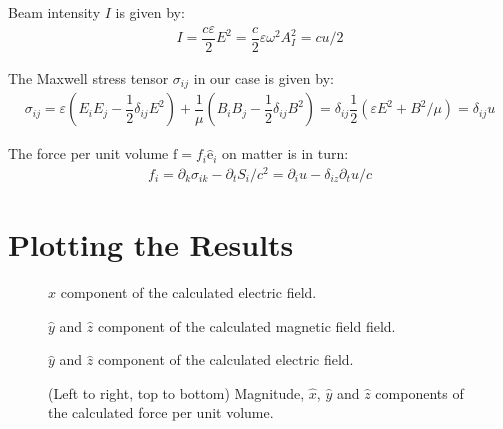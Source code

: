 \documentclass[10pt]{article}
\newcommand{\f}[2]{\dfrac{#1}{#2}} %
\newcommand{\p}[1]{\left(#1\right)} %
\renewcommand{\epsilon}{\varepsilon} %
\renewcommand{\v}[1]{\boldsymbol{\mathrm{#1}}} %
\newcommand{\uv}[1]{\hat{\boldsymbol{\mathrm{#1}}}} %
\renewcommand{\d}{\partial} %
\begin{document}
Beam intensity $I$ is given by:
\begin{align*}
  I=\f{c\epsilon}2E^2=\f c2\epsilon\omega^2A_I^2=cu/2
\end{align*}

The Maxwell stress tensor $\sigma_{ij}$ in our case is given by:
\begin{align*}
  \sigma_{ij}=\epsilon\p{E_iE_j-\f12\delta_{ij}E^2}
  +\f1\mu\p{B_iB_j-\f12\delta_{ij}B^2} =\delta_{ij}\f12\p{\epsilon
    E^2+B^2/\mu}=\delta_{ij}u
\end{align*}

The force per unit volume $\v f=f_i\uv e_i$ on matter is in turn:
\begin{align*}
  f_i=\d_k\sigma_{ik}-\d_tS_i/c^2=\d_iu-\delta_{iz}\d_tu/c
\end{align*}





\section*{Plotting the Results}

\begin{figure}[h]
\centering
\caption{$\hat{x}$ component of the calculated electric field.}
\label{g:Ex}
\end{figure}


\begin{figure}[h]
\centering
\caption{$\hat{y}$ and $\hat{z}$  component of the calculated magnetic field field.}
\label{g:By}
\end{figure}









\begin{figure}[h]
\centering
\caption{$\hat{y}$ and $\hat{z}$ component of the calculated electric field.}
\label{g:Sy}
\end{figure}


\begin{figure}[h]
\centering
\caption{(Left to right, top to bottom) Magnitude, $\hat{x}$, $\hat{y}$ and $\hat{z}$ components of the calculated force per unit volume.}
\label{g:F}
\end{figure}
\end{document}
